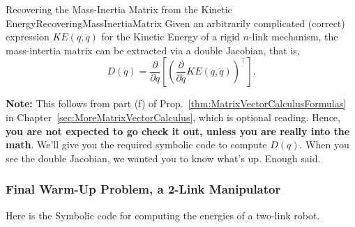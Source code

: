 \begin{methodColor}{Recovering the Mass-Inertia Matrix from the Kinetic Energy}{RecoveringMassInertiaMatrix}
    Given an arbitrarily complicated (correct) expression $KE(q, \dot{q})$ for the Kinetic Energy of a rigid $n$-link mechanism, the mass-intertia matrix can be extracted via a double Jacobian, that is, 
    $$D(q) = \frac{\partial}{\partial \dot{q}} \left[ \left( \frac{\partial}{\partial \dot{q}} KE(q, \dot{q}) \right)^\top \right]. $$

\textbf{Note:}  This follows from part (f) of Prop.~\ref{thm:MatrixVectorCalculusFormulas}  in Chapter~\ref{sec:MoreMatrixVectorCalculus}, which is optional reading. Hence, \textbf{you are not expected to go check it out, unless you are really into the math}. We'll give you the required symbolic code to compute $D(q)$. When you see the double Jacobian, we wanted you to know what's up. Enough said. 
\end{methodColor}

\Qed

\subsubsection{Final Warm-Up Problem, a 2-Link Manipulator}

Here is the Symbolic code for computing the energies of a two-link robot.

\vspace{.2cm}

